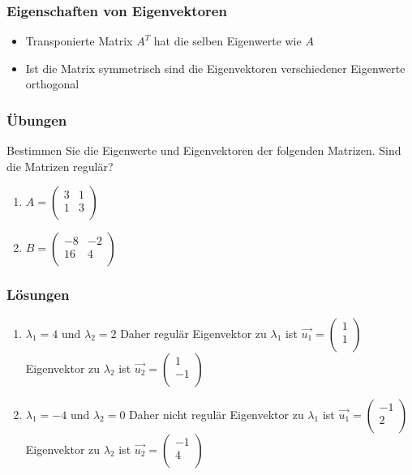 \begin{frame}
    \frametitle{Eigenschaften von Eigenvektoren}
    \begin{itemize}
        \item Transponierte Matrix $A ^{T}$ hat die selben Eigenwerte wie $A$
        \item Ist die Matrix symmetrisch sind die Eigenvektoren verschiedener Eigenwerte orthogonal
    \end{itemize}
\end{frame}

\begin{frame}
    \frametitle{Übungen}
    Bestimmen Sie die Eigenwerte und Eigenvektoren der folgenden Matrizen.
    Sind die Matrizen regulär?
  \begin{enumerate}
        \item
        $A = \begin{pmatrix}
                 3 & 1 \\
                 1 & 3 \\
        \end{pmatrix}$
        \item
        $B = \begin{pmatrix}
                 -8 & -2 \\
                 16 & 4  \\
        \end{pmatrix}$
    \end{enumerate}
\end{frame}

\begin{frame}
    \frametitle{Lösungen}
    \begin{enumerate}
    \item $\lambda_1 = 4$ und $\lambda_2 = 2$ Daher regulär
    \newline
    Eigenvektor zu $\lambda_1$ ist $\vec{u_1} = \begin{pmatrix}
        1 \\
        1 \\
    \end{pmatrix}$
    \newline
    Eigenvektor zu $\lambda_2$ ist $\vec{u_2} = \begin{pmatrix}
        1 \\
        -1 \\
    \end{pmatrix}$
    \item $\lambda_1 = -4$ und $\lambda_2 = 0$ Daher nicht regulär
    \newline
    Eigenvektor zu $\lambda_1$ ist $\vec{u_1} = \begin{pmatrix}
        -1 \\
        2 \\
    \end{pmatrix}$
    \newline
    Eigenvektor zu $\lambda_2$ ist $\vec{u_2} = \begin{pmatrix}
        -1 \\
        4 \\
    \end{pmatrix}$
    \end{enumerate}
\end{frame}